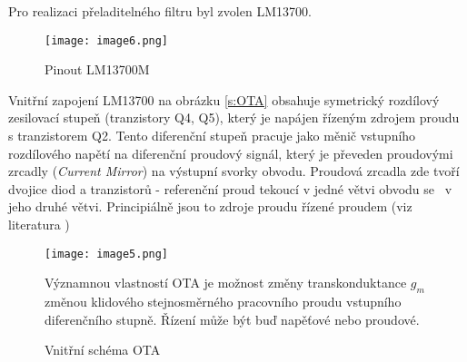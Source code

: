 \begin{center}
\begin{table}[h]
  \caption[Porovnání integrovaných obvodů se dvěma OTA]{\label{tab:Porovnání IC se dvěma OTA}Porovnání IC se dvěma OTA \cite{13}}
  \end{table}
\end{center}
\noindent Pro realizaci přeladitelného filtru byl zvolen LM13700.
\begin{figure}[h]
\centering
\texttt{[image: image6.png]}
\caption[Pinout LM13700M]{Pinout LM13700M \cite{14} \label{s:PIN}}
\end{figure}
\noindent Vnitřní zapojení LM13700 na obrázku \ref{s:OTA} obsahuje symetrický rozdílový zesilovací stupeň (tranzistory Q4, Q5), který je napájen řízeným zdrojem proudu s tranzistorem Q2. Tento diferenční stupeň pracuje jako měnič vstupního rozdílového napětí na diferenční proudový signál, který je převeden proudovými zrcadly (\textit{Current Mirror}) na výstupní svorky obvodu. Proudová zrcadla zde tvoří dvojice diod a tranzistorů - referenční proud tekoucí v jedné větvi obvodu se  ~v jeho druhé větvi. Principiálně jsou to zdroje proudu řízené proudem (viz literatura \cite{18})
\begin{figure}[h]
\centering
\texttt{[image: image5.png]}
\caption[Vnitřní schéma OTA]{Vnitřní schéma OTA \cite{14}\label{sec:OTA}}
\noindent Významnou vlastností OTA je možnost změny transkonduktance $g_m$ změnou klidového stejnosměrného pracovního proudu vstupního diferenčního stupně. Řízení může být buď napěťové nebo proudové.
\end{figure}